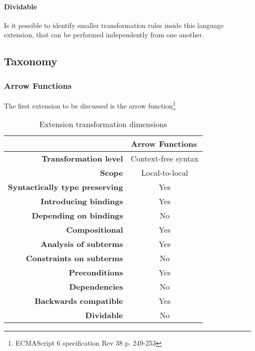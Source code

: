 \documentclass[10pt,a4paper,draft]{article}
\begin{document}
\paragraph{Dividable}
Is it possible to identify smaller transformation rules inside this language extension, that can be performed independently from one another.

\subsection{Taxonomy}

\subsubsection{Arrow Functions}
The first extension to be discussed is the arrow function\footnote{ECMAScript 6 specification Rev 38 p. 249-253}
\begin{table}[h]
\centering
\caption{Extension transformation dimensions}
\label{arrow-function-table}
\begin{tabular}{@{}rc@{}}
\toprule
                                       & \multicolumn{1}{l}{\textbf{Arrow Functions}} \\ \midrule
\textbf{Transformation level}          & Context-free syntax                          \\
\textbf{Scope}                         & Local-to-local                               \\
\textbf{Syntactically type preserving} & Yes                                          \\
\textbf{Introducing bindings}          & Yes                                          \\
\textbf{Depending on bindings}         & No                                           \\
\textbf{Compositional}                 & Yes                                          \\
\textbf{Analysis of subterms}          & Yes                                          \\
\textbf{Constraints on subterms}       & No                                           \\
\textbf{Preconditions}                 & Yes                                          \\
\textbf{Dependencies}                  & No                                           \\
\textbf{Backwards compatible}          & Yes                                          \\
\textbf{Dividable}                     & No                                           \\ \bottomrule
\end{tabular}
\end{table}

{}

\end{document}

